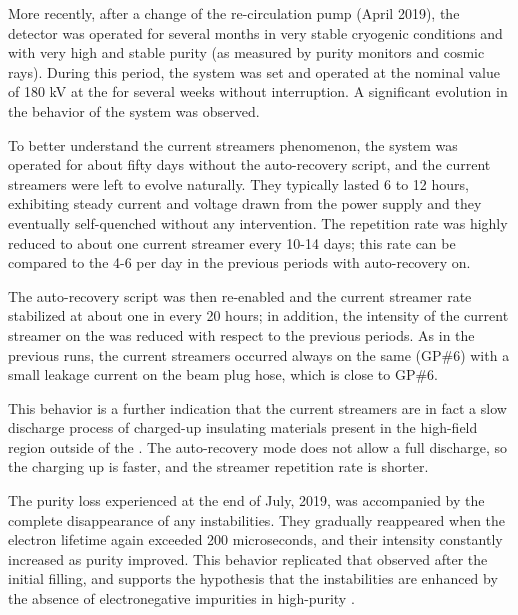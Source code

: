 More recently, after a change of the  re-circulation pump (April 2019), the detector was operated for several months in very stable cryogenic conditions and with very high and stable  purity (as measured by purity monitors and cosmic rays). During this period, the  system was set and operated at the nominal value of 180 kV at the   for several weeks without interruption. A significant evolution in the behavior of the  system was observed. 

To better understand the current streamers phenomenon, the  system was operated for about fifty days without the auto-recovery script, and the current streamers were left to evolve naturally. They typically lasted 6 to 12 hours, exhibiting steady current and voltage drawn from the  power supply and they eventually self-quenched without any intervention. The repetition rate was highly reduced to about one current streamer every 10-14 days; this rate can be compared to the 4-6 per day in the previous periods with auto-recovery on.

The auto-recovery script was then re-enabled and the current streamer rate stabilized at about one in every 20 hours; in addition, the intensity of the current streamer on the  was reduced with respect to the previous periods. As in the previous runs, the current streamers occurred always on the same  (GP\#6) with a small leakage current on the beam plug hose, which is close to GP\#6. 

This behavior is a further indication that the current streamers are in fact a slow discharge process of charged-up insulating materials present in the high-field region outside of the . The auto-recovery mode does not allow a full discharge, so the charging up is faster, and the streamer repetition rate is shorter.

The  purity loss experienced at the end of July, 2019, was accompanied by the complete disappearance of any  instabilities. 
They gradually reappeared when the electron lifetime again exceeded 200 microseconds, and their intensity constantly increased as purity improved. This behavior replicated that observed after the initial filling, and supports the hypothesis that the  instabilities are enhanced by the absence of electronegative impurities in high-purity .

